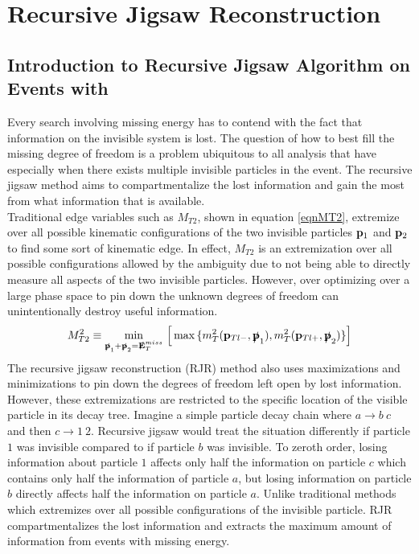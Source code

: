 \chapter{Recursive Jigsaw Reconstruction}
\label{chap:jigsaw}

\section{Introduction to Recursive Jigsaw Algorithm on Events with \MET}
\label{Jigsaw:Intro}

\indent Every search involving missing energy has to contend with the fact that information on the invisible system is lost.  The question of how to best fill the missing degree of freedom is a problem ubiquitous to all analysis that have \MET especially when there exists multiple invisible particles in the event. The recursive jigsaw method aims to compartmentalize the lost information and gain the most from what information that is available.\\
\indent Traditional edge variables such as $M_{T2}$, shown in equation \ref{eqnMT2}, extremize over all possible kinematic configurations of the two invisible particles ${\bf p}_1$ and ${\bf p}_2$ to find some sort of kinematic edge.  In effect, $M_{T2}$ is an extremization over all possible configurations allowed by the ambiguity due to not being able to directly measure all aspects of the two invisible particles.  However, over optimizing over a large phase space to pin down the unknown degrees of freedom can unintentionally destroy useful information.  \\
\begin{equation}
\label{eqnMT2}
M^{2}_{T2} \equiv \mymin[\slashed{\bf p}_{1}+\slashed{\bf p}_{2}=\slashed{\bf E}_{T}^{miss}]  \Big[ \mymax[] \{ m_{T}^{2}({\bf p}_{Tl-},\slashed{\bf p}_{1}), m_{T}^{2}({\bf p}_{Tl+},\slashed{\bf p}_{2})\} \Big]
\end{equation}
\indent The recursive jigsaw reconstruction (RJR) method also uses maximizations and minimizations to pin down the degrees of freedom left open by lost information.  However, these extremizations are restricted to the specific location of the visible particle in its decay tree.  Imagine a simple particle decay chain where $a \rightarrow b~c$ and then $c \rightarrow 1~2$.  Recursive jigsaw would treat the situation differently if particle $1$ was invisible compared to if particle $b$ was invisible.  To zeroth order, losing information about particle $1$ affects only half the information on particle $c$ which contains only half the information of particle $a$, but losing information on particle $b$ directly affects half the information on particle $a$.   Unlike traditional methods which extremizes over all possible configurations of the invisible particle. RJR compartmentalizes the lost information and extracts the maximum amount of information from events with missing energy.  \\
